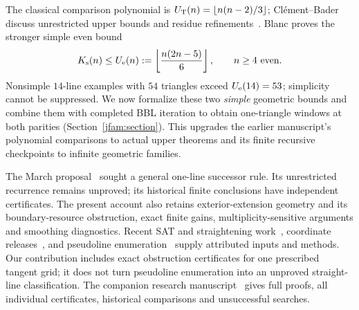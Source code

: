 The classical comparison polynomial is $U_{\mathrm T}(n)=\left\lfloor n(n-2)/3\right\rfloor$; Cl\'ement--Bader discuss unrestricted upper bounds and residue refinements~\cite{clementbader2007}. Blanc proves the stronger simple even bound~\cite{blanc2011}
\begin{equation}\label{j:blanc}
 K_{\mathrm s}(n)\le U_{\rm e}(n):=\left\lfloor\frac{n(2n-5)}6\right\rfloor,\qquad n\ge4\text{ even}.
\end{equation}
Nonsimple $14$-line examples with $54$ triangles exceed $U_{\rm e}(14)=53$; simplicity cannot be suppressed. We now formalize these two \emph{simple} geometric bounds and combine them with completed BBL iteration to obtain one-triangle windows at both parities (Section~\ref{jfam:section}). This upgrades the earlier manuscript's polynomial comparisons to actual upper theorems and its finite recursive checkpoints to infinite geometric families.

The March proposal~\cite{zarzuelo2026} sought a general one-line successor rule. Its unrestricted recurrence remains unproved; its historical finite conclusions have independent certificates. The present account also retains exterior-extension geometry and its boundary-resource obstruction, exact finite gains, multiplicity-sensitive arguments and smoothing diagnostics. Recent SAT and straightening work~\cite{savchuk2025}, coordinate releases~\cite{maiorana2026,parpalakutkinGallery2026}, and pseudoline enumeration~\cite{parpalakutkinEnumeration2026} supply attributed inputs and methods. Our contribution includes exact obstruction certificates for one prescribed tangent grid; it does not turn pseudoline enumeration into an unproved straight-line classification. The companion research manuscript~\cite{zarzueloFull2026} gives full proofs, all individual certificates, historical comparisons and unsuccessful searches.
